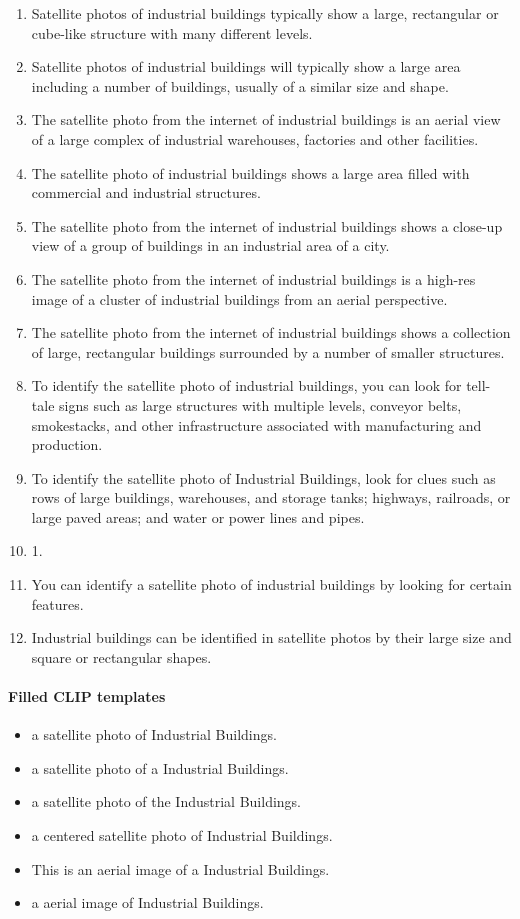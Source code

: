 \documentclass[11pt]{article}
\begin{document}
\begin{enumerate}
\item Satellite photos of industrial buildings typically show a large, rectangular or cube-like structure with many different levels.
\item Satellite photos of industrial buildings will typically show a large area including a number of buildings, usually of a similar size and shape.
\item The satellite photo from the internet of industrial buildings is an aerial view of a large complex of industrial warehouses, factories and other facilities.
\item The satellite photo of industrial buildings shows a large area filled with commercial and industrial structures.
\item The satellite photo from the internet of industrial buildings shows a close-up view of a group of buildings in an industrial area of a city.
\item The satellite photo from the internet of industrial buildings is a high-res image of a cluster of industrial buildings from an aerial perspective.
\item The satellite photo from the internet of industrial buildings shows a collection of large, rectangular buildings surrounded by a number of smaller structures.
\item To identify the satellite photo of industrial buildings, you can look for tell-tale signs such as large structures with multiple levels, conveyor belts, smokestacks, and other infrastructure associated with manufacturing and production.
\item To identify the satellite photo of Industrial Buildings, look for clues such as rows of large buildings, warehouses, and storage tanks; highways, railroads, or large paved areas; and water or power lines and pipes.
\item 1.
\item You can identify a satellite photo of industrial buildings by looking for certain features.
\item Industrial buildings can be identified in satellite photos by their large size and square or rectangular shapes.
\end{enumerate}
\paragraph{Filled CLIP templates}\begin{itemize}
\item a satellite photo of Industrial Buildings.
\item a satellite photo of a Industrial Buildings.
\item a satellite photo of the Industrial Buildings.
\item a centered satellite photo of Industrial Buildings.
\item This is an aerial image of a Industrial Buildings.
\item a aerial image of Industrial Buildings.
\end{itemize}
\end{document}
